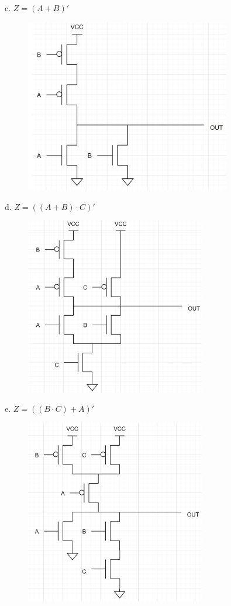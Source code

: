 \documentclass{article}
\begin{document}
c. $ Z = (A + B)'$
\begin{figure}[!h]
    \centering
    \includegraphics[width=0.8\textwidth]{figures/cmos1c_solution.png}
\end{figure}
\newpage
d. $ Z = ((A + B) \cdot C)'$
\begin{figure}[!h]
    \centering
    \includegraphics[width=0.7\textwidth]{figures/cmos1d_solution.png}
\end{figure}

e. $ Z = ((B \cdot C) + A)'$
\begin{figure}[!h]
    \centering
    \includegraphics[width=0.7\textwidth]{figures/cmos1e_solution.png}
\end{figure}
\newpage
\end{document}
